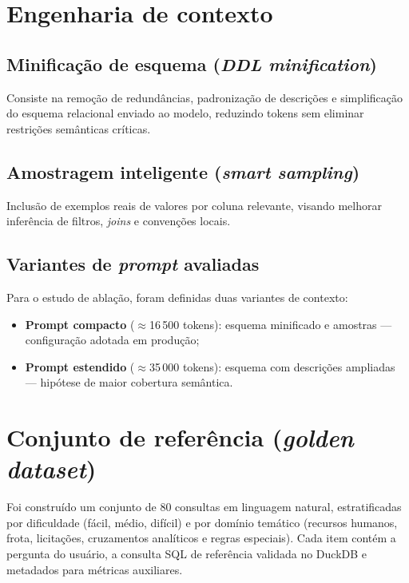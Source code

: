 \section{Engenharia de contexto}

\subsection{Minificação de esquema (\textit{DDL minification})}

Consiste na remoção de redundâncias, padronização de descrições e simplificação do esquema relacional enviado ao modelo, reduzindo tokens sem eliminar restrições semânticas críticas.

\subsection{Amostragem inteligente (\textit{smart sampling})}

Inclusão de exemplos reais de valores por coluna relevante, visando melhorar inferência de filtros, \textit{joins} e convenções locais.

\subsection{Variantes de \textit{prompt} avaliadas}

Para o estudo de ablação, foram definidas duas variantes de contexto:

\begin{itemize}
    \item \textbf{Prompt compacto} ($\approx$16\,500 tokens): esquema minificado e amostras --- configuração adotada em produção;
    \item \textbf{Prompt estendido} ($\approx$35\,000 tokens): esquema com descrições ampliadas --- hipótese de maior cobertura semântica.
\end{itemize}

\section{Conjunto de referência (\textit{golden dataset})}

Foi construído um conjunto de 80 consultas em linguagem natural, estratificadas por dificuldade (fácil, médio, difícil) e por domínio temático (recursos humanos, frota, licitações, cruzamentos analíticos e regras especiais). Cada item contém a pergunta do usuário, a consulta SQL de referência validada no DuckDB e metadados para métricas auxiliares.

